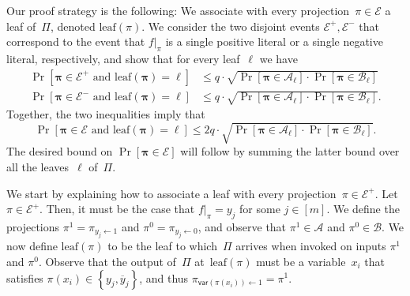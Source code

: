 \documentclass[11pt]{article}
\numberwithin{equation}{section}
\theoremstyle{definition}
\theoremstyle{plain}
\theoremstyle{definition}\newtheorem{notation}[theorem]{Notation}\theoremstyle{plain}
\newcommand{\cA}{\mathcal{A}}
\newcommand{\cB}{\mathcal{B}}
\newcommand{\p}{\boldsymbol{\pi}}
\newcommand{\cE}{\mathcal{E}}
\newcommand{\lp}{\mathrm{leaf}}
\newcommand{\var}{\mathsf{var}}
\theoremstyle{definition}
\theoremstyle{plain}
\begin{document}
Our proof strategy is the following: We associate with every projection~$\pi\in\cE$
a leaf of~$\Pi$, denoted $\lp(\pi)$. We consider the two disjoint
events $\cE^{+},\cE^{-}$ that correspond to the event that $f|_{\pi}$
is a single positive literal or a single negative literal, respectively,
and show that for every leaf~$\ell$ we have 
\begin{align}
\Pr\!\left[\p\in\cE^{+}\text{ and }\lp(\p)=\ell\right] & \le q\cdot\sqrt{\Pr\!\left[\p\in\cA_{\ell}\right]\cdot\Pr\!\left[\p\in\cB_{\ell}\right]}\label{shrinkage-to-single-literal-leaf-bound-positive}\\
\Pr\!\left[\p\in\cE^{-}\text{ and }\lp(\p)=\ell\right] & \le q\cdot\sqrt{\Pr\!\left[\p\in\cA_{\ell}\right]\cdot\Pr\!\left[\p\in\cB_{\ell}\right]}.\label{shrinkage-to-single-literal-leaf-bound-negative}
\end{align}
Together, the two inequalities imply that 
\[
\Pr\!\left[\p\in\cE\text{ and }\lp(\p)=\ell\right]\le2q\cdot\sqrt{\Pr\!\left[\p\in\cA_{\ell}\right]\cdot\Pr\!\left[\p\in\cB_{\ell}\right]}.
\]
The desired bound on $\Pr\!\left[\p\in\cE\right]$ will follow by
summing the latter bound over all the leaves~$\ell$ of~$\Pi$.

We start by explaining how to associate a leaf with every projection~$\pi\in\cE^{+}$.
Let $\pi\in\cE^{+}$. Then, it must be the case that $f|_{\pi}=y_{j}$
for some $j\in\left[m\right]$. We define the projections $\pi^{1}=\pi_{y_{j}\gets1}$
and $\pi^{0}=\pi_{y_{j}\gets0}$, and observe that $\pi^{1}\in\cA$
and $\pi^{0}\in\cB$. We now define $\lp(\pi)$ to be the leaf to
which~$\Pi$ arrives when invoked on inputs $\pi^{1}$ and $\pi^{0}$.
Observe that the output of~$\Pi$ at~$\lp(\pi)$ must be a variable~$x_{i}$
that satisfies $\pi(x_{i})\in\left\{ y_{j},\overline{y}_{j}\right\} $,
and thus $\pi_{\var(\pi(x_{i}))\gets1}=\pi^{1}$.
\end{document}
